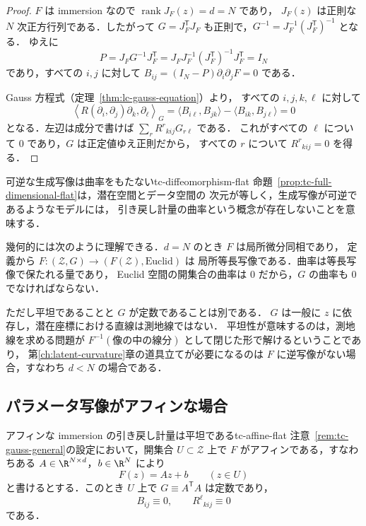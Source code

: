 \begin{proof}
  $F$ は immersion なので $\operatorname{rank}J_F(z)=d=N$ であり，
  $J_F(z)$ は正則な $N$ 次正方行列である．したがって
  $G=J_F^{\mathsf T}J_F$ も正則で，$G^{-1}=J_F^{-1}(J_F^{\mathsf T})^{-1}$ となる．
  ゆえに
  \[
    P
    =J_FG^{-1}J_F^{\mathsf T}
    =J_FJ_F^{-1}(J_F^{\mathsf T})^{-1}J_F^{\mathsf T}
    =I_N
  \]
  であり，すべての $i,j$ に対して
  $B_{ij}=(I_N-P)\partial_i\partial_jF=0$ である．

  Gauss 方程式（定理~\ref{thm:lc-gauss-equation}）より，
  すべての $i,j,k,\ell$ に対して
  \[
    \left\langle R(\partial_i,\partial_j)\partial_k,\partial_\ell\right\rangle_G
    =\langle B_{i\ell},B_{jk}\rangle-\langle B_{ik},B_{j\ell}\rangle
    =0
  \]
  となる．左辺は成分で書けば
  $\sum_{r}R^r{}_{kij}G_{r\ell}$ である．
  これがすべての $\ell$ について $0$ であり，$G$ は正定値ゆえ正則だから，
  すべての $r$ について $R^r{}_{kij}=0$ を得る．
\end{proof}

\begin{remark}{可逆な生成写像は曲率をもたない}{tc-diffeomorphism-flat}
  命題~\ref{prop:tc-full-dimensional-flat}は，潜在空間とデータ空間の
  次元が等しく，生成写像が可逆であるようなモデルには，
  引き戻し計量の曲率という概念が存在しないことを意味する．

  幾何的には次のように理解できる．$d=N$ のとき $F$ は局所微分同相であり，
  定義から $F\colon(\mathcal{Z},G)\to(F(\mathcal{Z}),\text{Euclid})$ は
  局所等長写像である．曲率は等長写像で保たれる量であり，
  Euclid 空間の開集合の曲率は $0$ だから，$G$ の曲率も $0$ でなければならない．

  ただし平坦であることと $G$ が定数であることは別である．
  $G$ は一般に $z$ に依存し，潜在座標における直線は測地線ではない．
  平坦性が意味するのは，測地線を求める問題が
  $F^{-1}(\text{像の中の線分})$ として閉じた形で解けるということであり，
  第\ref{ch:latent-curvature}章の道具立てが必要になるのは
  $F$ に逆写像がない場合，すなわち $d<N$ の場合である．
\end{remark}

\subsection{パラメータ写像がアフィンな場合}

\begin{proposition}{アフィンな immersion の引き戻し計量は平坦である}{tc-affine-flat}
  注意~\ref{rem:tc-gauss-general}の設定において，開集合 $U\subset\mathcal{Z}$ 上で
  $F$ がアフィンである，すなわちある $A\in\R^{N\times d}$，$b\in\R^N$ により
  \[
    F(z)=Az+b\qquad(z\in U)
  \]
  と書けるとする．このとき $U$ 上で $G\equiv A^{\mathsf T}A$ は定数であり，
  \[
    B_{ij}\equiv0,
    \qquad
    R^\ell{}_{kij}\equiv0
  \]
  である．
\end{proposition}

